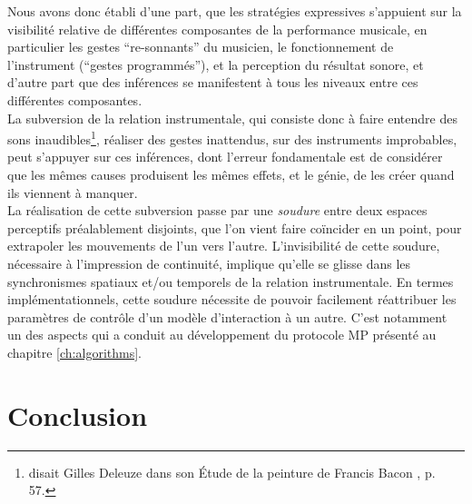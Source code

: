 \noindent Nous avons donc établi d'une part, que les stratégies expressives s'appuient sur la visibilité relative de différentes composantes de la performance musicale, en particulier les gestes ``re-sonnants'' du musicien, le fonctionnement de l'instrument (``gestes programmés''), et la perception du résultat sonore, et d'autre part que des inférences se manifestent à tous les niveaux entre ces différentes composantes.\\
\indent La subversion de la relation instrumentale, qui consiste donc à faire entendre des sons inaudibles\footnote{ disait Gilles Deleuze dans son Étude de la peinture de Francis Bacon \cite{deleuze_francis_1981}, p. 57.}, réaliser des gestes inattendus, sur des instruments improbables, peut s'appuyer sur ces inférences, dont l'erreur fondamentale est de considérer que les mêmes causes produisent les mêmes effets, et le génie, de les créer quand ils viennent à manquer.\\
\indent La réalisation de cette subversion passe par une \textit{soudure} entre deux espaces perceptifs préalablement disjoints, que l'on vient faire coïncider en un point, pour extrapoler les mouvements de l'un vers l'autre. L'invisibilité de cette soudure, nécessaire à l'impression de continuité, implique qu'elle se glisse dans les synchronismes spatiaux et/ou temporels de la relation instrumentale. 
En termes implémentationnels, cette soudure nécessite de pouvoir facilement réattribuer les paramètres de contrôle d'un modèle d'interaction à un autre. C'est notamment un des aspects qui a conduit au développement du protocole MP présenté au chapitre \ref{ch:algorithms}.

\section{Conclusion}
\label{sec:gesture:conclusion}

